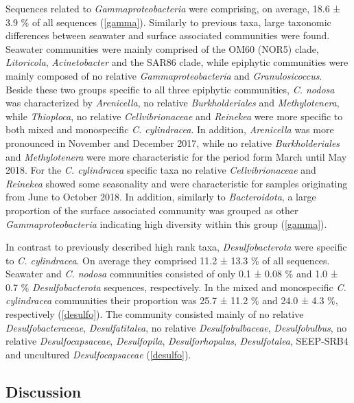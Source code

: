 \documentclass[12pt,]{article}
\begin{document}
Sequences related to \emph{Gammaproteobacteria} were comprising, on
average, 18.6 ± 3.9 \si{\percent} of all sequences (\autoref{gamma}).
Similarly to previous taxa, large taxonomic differences between seawater
and surface associated communities were found. Seawater communities were
mainly comprised of the OM60 (NOR5) clade, \emph{Litoricola},
\emph{Acinetobacter} and the SAR86 clade, while epiphytic communities
were mainly composed of no relative \emph{Gammaproteobacteria} and
\emph{Granulosicoccus}. Beside these two groups specific to all three
epiphytic communities, \emph{C. nodosa} was characterized by
\emph{Arenicella}, no relative \emph{Burkholderiales} and
\emph{Methylotenera}, while \emph{Thioploca}, no relative
\emph{Cellvibrionaceae} and \emph{Reinekea} were more specific to both
mixed and monospecific \emph{C. cylindracea}. In addition,
\emph{Arenicella} was more pronounced in November and December 2017,
while no relative \emph{Burkholderiales} and \emph{Methylotenera} were
more characteristic for the period form March until May 2018. For the
\emph{C. cylindracea} specific taxa no relative \emph{Cellvibrionaceae}
and \emph{Reinekea} showed some seasonality and were characteristic for
samples originating from June to October 2018. In addition, similarly to
\emph{Bacteroidota}, a large proportion of the surface associated
community was grouped as other \emph{Gammaproteobacteria} indicating
high diversity within this group (\autoref{gamma}).

In contrast to previously described high rank taxa,
\emph{Desulfobacterota} were specific to \emph{C. cylindracea}. On
average they comprised 11.2 ± 13.3 \si{\percent} of all sequences.
Seawater and \emph{C. nodosa} communities consisted of only 0.1 ± 0.08
\si{\percent} and 1.0 ± 0.7 \si{\percent} \emph{Desulfobacterota}
sequences, respectively. In the mixed and monospecific \emph{C.
cylindracea} communities their proportion was 25.7 ± 11.2 \si{\percent}
and 24.0 ± 4.3 \si{\percent}, respectively (\autoref{desulfo}). The
community consisted mainly of no relative \emph{Desulfobacteraceae},
\emph{Desulfatitalea}, no relative \emph{Desulfobulbaceae},
\emph{Desulfobulbus}, no relative \emph{Desulfocapsaceae},
\emph{Desulfopila}, \emph{Desulforhopalus}, \emph{Desulfotalea},
SEEP-SRB4 and uncultured \emph{Desulfocapsaceae} (\autoref{desulfo}).

\newpage

\hypertarget{discussion}{%
\subsection{Discussion}\label{discussion}}
\end{document}
